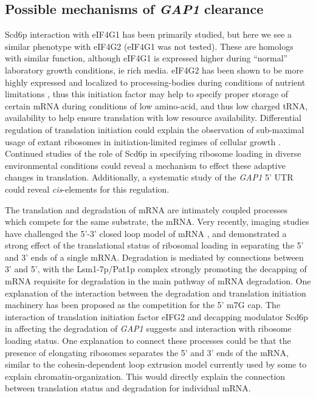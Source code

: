 \subsection{Possible mechanisms of \textit{GAP1} clearance}

Scd6p interaction with eIF4G1 has been primarily studied, 
but here we see a similar phenotype with eIF4G2 
(eIF4G1 was not tested). These are
homologs with similar function, although eIF4G1 is expressed higher
during “normal” laboratory growth conditions, ie rich media. 
eIF4G2 has been shown to be more highly expressed and localized to
processing-bodies during conditions of nutrient limitations 
\parencite{brengues2007accumulation}, 
thus this initiation factor may help to specify
proper storage of certain mRNA during conditions of low amino-acid,
and thus low charged tRNA, availability to help ensure translation
with low resource availability. Differential regulation of 
translation initiation could explain the observation of sub-maximal
usage of extant ribosomes in initiation-limited regimes of cellular
growth \parencite{kafri2016cost,metzl2017principles}.
Continued studies of the role of Scd6p in specifying ribosome
loading in diverse environmental conditions could reveal a mechanism
to effect these adaptive changes in translation.
Additionally, a systematic study of the \textit{GAP1} 5' UTR could
reveal \textit{cis}-elements for this regulation.

The translation and degradation of mRNA are intimately coupled
processes which compete for the same substrate, the mRNA. 
Very recently, imaging studies have challenged the 5'-3' closed loop
model of mRNA \parencite{adivarahan2017spatial}, and demonstrated
a strong effect of the translational status of ribosomal loading in 
separating the 5' and 3' ends of a single mRNA.
Degradation is mediated by connections between 3’ and 5’, 
with the Lsm1-7p/Pat1p complex strongly promoting the decapping of
mRNA requisite for degradation in the main pathway of mRNA
degradation.
One explanation of the interaction between the degradation and
translation initiation machinery has been proposed as the competition
for the 5' m7G cap. 
The interaction of translation initiation factor eIFG2 and
decapping modulator Scd6p in affecting the degradation of
\textit{GAP1} suggests and interaction with ribosome loading status.
One explanation to connect these processes could be that the presence
of elongating ribosomes separates the 5' and 3' ends of the mRNA, 
similar to the cohesin-dependent loop extrusion model currently used 
by some to explain chromatin-organization. 
This would directly explain the connection between translation status
and degradation for individual mRNA.

